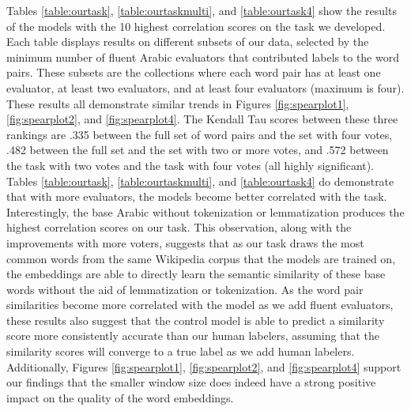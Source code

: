 Tables \ref{table:ourtask}, \ref{table:ourtaskmulti}, and \ref{table:ourtask4} show the results of the models with the 10 highest correlation scores on the task we developed. Each table displays results on different subsets of our data, selected by the minimum number of fluent Arabic evaluators that contributed labels to the word pairs. These subsets are the collections where each word pair has at least one evaluator, at least two evaluators, and at least four evaluators (maximum is four). These results all demonstrate similar trends in Figures \ref{fig:spearplot1}, \ref{fig:spearplot2}, and \ref{fig:spearplot4}. The Kendall Tau scores between these three rankings are .335 between the full set of word pairs and the set with four votes, .482 between the full set and the set with two or more votes, and .572 between the task with two votes and the task with four votes (all highly significant). Tables \ref{table:ourtask}, \ref{table:ourtaskmulti}, and \ref{table:ourtask4} do demonstrate that with more evaluators, the models become better correlated with the task. Interestingly, the base Arabic without tokenization or lemmatization produces the highest correlation scores on our task. This observation, along with the improvements with more voters, suggests that as our task draws the most common words from the same Wikipedia corpus that the models are trained on, the embeddings are able to directly learn the semantic similarity of these base words without the aid of lemmatization or tokenization. As the word pair similarities become more correlated with the model as we add fluent evaluators, these results also suggest that the control model is able to predict a similarity score more consistently accurate than our human labelers, assuming that the similarity scores will converge to a true label as we add human labelers. Additionally, Figures \ref{fig:spearplot1}, \ref{fig:spearplot2}, and \ref{fig:spearplot4} support our findings that the smaller window size does indeed have a strong positive impact on the quality of the word embeddings.



